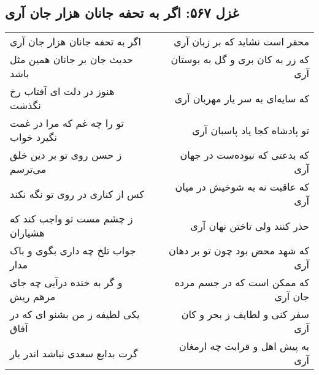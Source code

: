 \begin{center}
\section*{غزل ۵۶۷: اگر به تحفه جانان هزار جان آری}
\label{sec:567}
\begin{longtable}{l p{0.5cm} r}
اگر به تحفه جانان هزار جان آری
&&
محقر است نشاید که بر زبان آری
\\
حدیث جان بر جانان همین مثل باشد
&&
که زر به کان بری و گل به بوستان آری
\\
هنوز در دلت ای آفتاب رخ نگذشت
&&
که سایه‌ای به سر یار مهربان آری
\\
تو را چه غم که مرا در غمت نگیرد خواب
&&
تو پادشاه کجا یاد پاسبان آری
\\
ز حسن روی تو بر دین خلق می‌ترسم
&&
که بدعتی که نبوده‌ست در جهان آری
\\
کس از کناری در روی تو نگه نکند
&&
که عاقبت نه به شوخیش در میان آری
\\
ز چشم مست تو واجب کند که هشیاران
&&
حذر کنند ولی تاختن نهان آری
\\
جواب تلخ چه داری بگوی و باک مدار
&&
که شهد محض بود چون تو بر دهان آری
\\
و گر به خنده درآیی چه جای مرهم ریش
&&
که ممکن است که در جسم مرده جان آری
\\
یکی لطیفه ز من بشنو ای که در آفاق
&&
سفر کنی و لطایف ز بحر و کان آری
\\
گرت بدایع سعدی نباشد اندر بار
&&
به پیش اهل و قرابت چه ارمغان آری
\\
\end{longtable}
\end{center}
